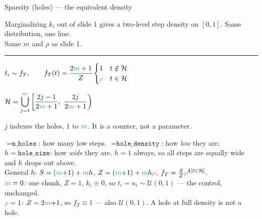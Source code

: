 \documentclass[11pt]{article}
\newcommand{\mm}{{\color{cy}m}}
\newcommand{\rr}{{\color{og}\rho}}
\newcommand{\cir}[2]{\tikz[baseline=(n.base)]{\node[draw=#1,line width=0.9pt,circle,inner sep=1.3pt](n){$#2$};}}
\newcommand{\gloss}[1]{{\sffamily\scriptsize\color{lab}#1}}
\begin{document}
{\sffamily\fontsize{24}{28}\selectfont Sparsity (holes) \;--- the equivalent density}

\vspace{2mm}
{\sffamily\small\color{lab}Marginalizing $k_i$ out of slide 1 gives a two-level step density
on $[0,1]$. Same distribution, one line.\\
Same {\color{cy}$m$} and {\color{og}$\rho$} as slide 1.}

\vspace{3mm}
\hrule
\vspace{5mm}

\begin{minipage}[t]{0.42\textwidth}
\vspace{0pt}
$\displaystyle t_i \sim f_T, \qquad
 f_T(t) = \frac{2\mm+1}{Z}\begin{cases} 1 & t \notin \mathcal{H} \\ \rr & t \in \mathcal{H}\end{cases}$

\vspace{3mm}
$\displaystyle \mathcal{H} = \bigcup_{j=1}^{\mm}
   \left[\frac{2j-1}{2\mm+1},\ \frac{2j}{2\mm+1}\right)$

\vspace{1mm}
\gloss{$j$ indexes the holes, $1$ to $\mm$. It is a counter, not a parameter.}

\vspace{3mm}
{\footnotesize
\cir{cy}{m} $=\texttt{n\_holes}$: how many low steps. \quad
\cir{og}{\rho} $=\texttt{hole\_density}$: how \emph{low} they are.\\
$h=\texttt{hole\_size}$: how \emph{wide} they are. $h=1$ always, so all
steps are equally wide and $h$ drops out above.\\[1mm]
General $h$: $S=(\mm{+}1)+\mm h$, $Z=(\mm{+}1)+\mm h\rr$,
$f_T=\frac{S}{Z}\rr^{\mathbf{1}[t\in\mathcal H]}$.\\[1mm]
$\mm=0$: one chunk, $Z=1$, $k_i\equiv 0$, so $t_i=u_i\sim\mathcal U(0,1)$ --- the control, unchanged.\\
$\rr=1$: $Z=2\mm{+}1$, so $f_T \equiv 1$ --- also $\mathcal U(0,1)$. A hole at full density is not a hole.}
\end{minipage}
\hfill
\end{document}
